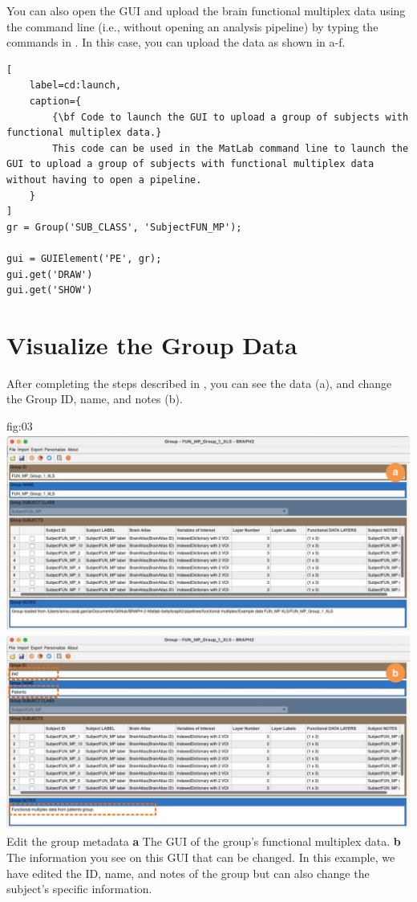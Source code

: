 \documentclass[justified]{tufte-handout}
\begin{document}
\begin{tcolorbox}[
	title=GUI launch from command line
]
You can also open the GUI and upload the brain functional multiplex data using the command line (i.e., without opening an analysis pipeline) by typing the commands in . In this case, you can upload the data as shown in a-f.

\begin{lstlisting}[
	label=cd:launch,
	caption={
		{\bf Code to launch the GUI to upload a group of subjects with functional multiplex data.}
		This code can be used in the MatLab command line to launch the GUI to upload a group of subjects with functional multiplex data without having to open a pipeline.
	}
]
gr = Group('SUB_CLASS', 'SubjectFUN_MP');

gui = GUIElement('PE', gr);
gui.get('DRAW')
gui.get('SHOW')
\end{lstlisting}
\end{tcolorbox}

\section{Visualize the Group Data}

After completing the steps described in , you can see the data (a), and change the Group ID, name, and notes (b). 

	{fig:03}
	{
	\includegraphics{fig03.jpg}
	}
	{Edit the group metadata}
	{ 
	{\bf a} The GUI of the group's functional multiplex data. 
	{\bf b} The information you see on this GUI that can be changed. In this example, we have edited the ID, name, and notes of the group but can also change the subject's specific information.
	}
\end{document}
